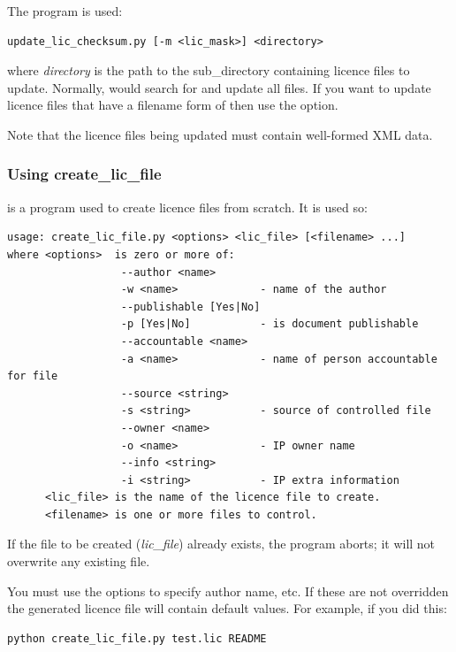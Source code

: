 \documentclass{manual}
\begin{document}
The program is used:

\begin{verbatim}
update_lic_checksum.py [-m <lic_mask>] <directory>
\end{verbatim}

where \emph{directory} is the path to the sub_directory containing licence files to update.
Normally,  would search for and update all  files.  If you
want to update licence files that have a filename form of  then use the
 option.

Note that the licence files being updated must contain well-formed XML data.

\subsubsection{Using create_lic_file}
\label{subsubsec:create_lic_file_use}

 is a program used to create licence files from scratch.  It is used so:

\begin{verbatim}
usage: create_lic_file.py <options> <lic_file> [<filename> ...]
where <options>  is zero or more of:
                  --author <name>
                  -w <name>             - name of the author
                  --publishable [Yes|No]
                  -p [Yes|No]           - is document publishable
                  --accountable <name>
                  -a <name>             - name of person accountable for file
                  --source <string>
                  -s <string>           - source of controlled file
                  --owner <name>
                  -o <name>             - IP owner name
                  --info <string>
                  -i <string>           - IP extra information
      <lic_file> is the name of the licence file to create.
      <filename> is one or more files to control.
\end{verbatim}

If the file to be created (\emph{lic_file}) already exists, the program aborts; it will
not overwrite any existing file.

\pagebreak

You must use the options to specify author name, etc.  If these are not overridden the 
generated licence file will contain default values. For example, if you did this:

\begin{verbatim}
python create_lic_file.py test.lic README
\end{verbatim}
\end{document}
